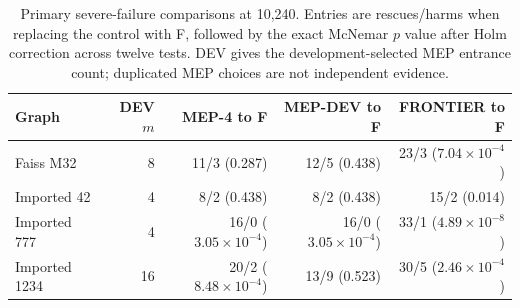 \begin{table}[t]
\centering
\caption{Primary severe-failure comparisons at 10,240. Entries are rescues/harms when replacing the control with F, followed by the exact McNemar $p$ value after Holm correction across twelve tests. DEV gives the development-selected MEP entrance count; duplicated MEP choices are not independent evidence.}
\label{tab:closest}
\small
\begin{tabular}{@{}lrrrr@{}}
\toprule
Graph & DEV $m$ & MEP-4 to F & MEP-DEV to F & FRONTIER to F \\
\midrule
Faiss M32 & 8 & 11/3 (0.287) & 12/5 (0.438) & 23/3 ($7.04\!\times\!10^{-4}$) \\
Imported 42 & 4 & 8/2 (0.438) & 8/2 (0.438) & 15/2 (0.014) \\
Imported 777 & 4 & 16/0 ($3.05\!\times\!10^{-4}$) & 16/0 ($3.05\!\times\!10^{-4}$) & 33/1 ($4.89\!\times\!10^{-8}$) \\
Imported 1234 & 16 & 20/2 ($8.48\!\times\!10^{-4}$) & 13/9 (0.523) & 30/5 ($2.46\!\times\!10^{-4}$) \\
\bottomrule
\end{tabular}
\end{table}
